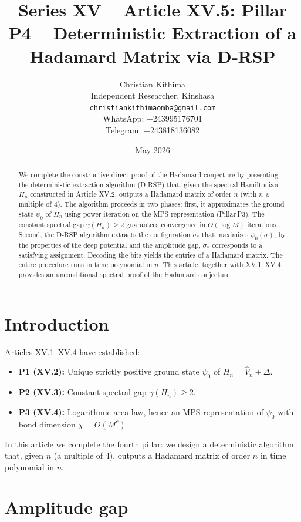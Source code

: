 \documentclass[11pt,a4paper]{article}
\title{Series XV – Article XV.5: Pillar P4 – Deterministic Extraction of a Hadamard Matrix via D‑RSP}
\author{Christian Kithima \\
Independent Researcher, Kinshasa \\
\texttt{christiankithimaomba@gmail.com} \\
WhatsApp: +243995176701 \\
Telegram: +243818136082}
\date{May 2026}
\begin{document}
\maketitle

\begin{abstract}
We complete the constructive direct proof of the Hadamard conjecture by presenting the deterministic extraction algorithm (D‑RSP) that, given the spectral Hamiltonian $H_n$ constructed in Article XV.2, outputs a Hadamard matrix of order $n$ (with $n$ a multiple of $4$). The algorithm proceeds in two phases: first, it approximates the ground state $\psi_0$ of $H_n$ using power iteration on the MPS representation (Pillar P3). The constant spectral gap $\gamma(H_n)\ge 2$ guarantees convergence in $O(\log M)$ iterations. Second, the D‑RSP algorithm extracts the configuration $\sigma_*$ that maximises $\psi_0(\sigma)$; by the properties of the deep potential and the amplitude gap, $\sigma_*$ corresponds to a satisfying assignment. Decoding the bits yields the entries of a Hadamard matrix. The entire procedure runs in time polynomial in $n$. This article, together with XV.1–XV.4, provides an unconditional spectral proof of the Hadamard conjecture.
\end{abstract}

\tableofcontents

\section{Introduction}

Articles XV.1–XV.4 have established:
\begin{itemize}
\item \textbf{P1 (XV.2):} Unique strictly positive ground state $\psi_0$ of $H_n = \hat{V}_n + \Delta$.
\item \textbf{P2 (XV.3):} Constant spectral gap $\gamma(H_n) \ge 2$.
\item \textbf{P3 (XV.4):} Logarithmic area law, hence an MPS representation of $\psi_0$ with bond dimension $\chi = O(M^c)$.
\end{itemize}
In this article we complete the fourth pillar: we design a deterministic algorithm that, given $n$ (a multiple of $4$), outputs a Hadamard matrix of order $n$ in time polynomial in $n$.

\section{Amplitude gap}
\end{document}
